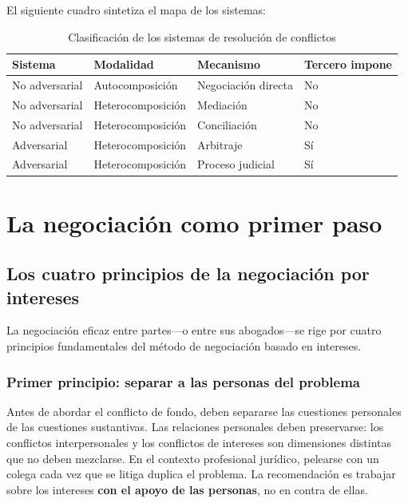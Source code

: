 \documentclass[12pt,oneside]{book}
\begin{document}
El siguiente cuadro sintetiza el mapa de los sistemas:

\begin{table}[H]
\centering
\begin{tabularx}{\textwidth}{
    >{\raggedright\arraybackslash}p{}
    >{\raggedright\arraybackslash}p{}
    >{\raggedright\arraybackslash}X
    >{\raggedright\arraybackslash}p{}
}
\toprule
\textbf{Sistema} & \textbf{Modalidad} & \textbf{Mecanismo} & \textbf{Tercero impone} \\
\midrule
No adversarial & Autocomposición & Negociación directa & No \\
No adversarial & Heterocomposición & Mediación & No \\
No adversarial & Heterocomposición & Conciliación & No \\
Adversarial & Heterocomposición & Arbitraje & Sí \\
Adversarial & Heterocomposición & Proceso judicial & Sí \\
\bottomrule
\end{tabularx}
\caption{Clasificación de los sistemas de resolución de conflictos}
\end{table}

\chapter{La negociaci\'on como primer paso}

\section{Los cuatro principios de la negociaci\'on por intereses}

La negociación eficaz entre partes---o entre sus abogados---se rige por
cuatro principios fundamentales del método de negociación basado en
intereses.

\subsection{Primer principio: separar a las personas del problema}

Antes de abordar el conflicto de fondo, deben separarse las cuestiones
personales de las cuestiones sustantivas. Las relaciones personales
deben preservarse: los conflictos interpersonales y los conflictos de
intereses son dimensiones distintas que no deben mezclarse. En el
contexto profesional jurídico, pelearse con un colega cada vez que se
litiga duplica el problema. La recomendación es trabajar sobre los
intereses \textbf{con el apoyo de las personas}, no en contra de ellas.
\end{document}
